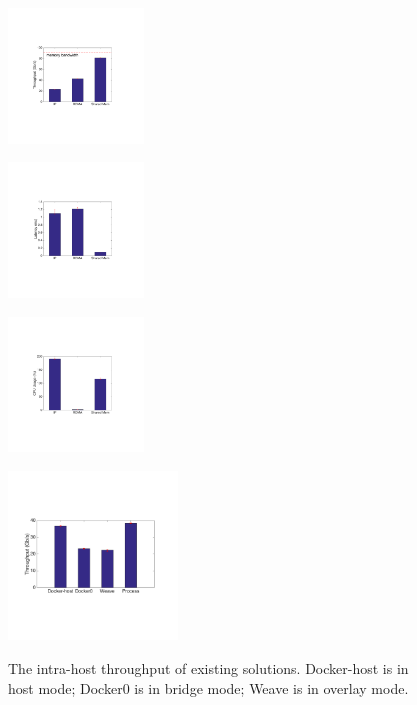 \iffalse

     \begin{figure}[ht]
     \centering 
     \includegraphics[width=0.32\textwidth]{figures/motivation/eval_baremetal_thr.pdf}      
     \label{fig:eval_baremetal_thr}
     \caption{} 
     \end{figure}

     \begin{figure}[ht]
     \centering 
     \includegraphics[width=0.32\textwidth]{figures/motivation/eval_baremetal_latency.pdf}      
     \label{fig:eval_baremetal_latency}
     \caption{} 
     \end{figure}

     \begin{figure}[ht]
     \centering 
     \includegraphics[width=0.32\textwidth]{figures/motivation/eval_baremetal_cpu.pdf}      
     \label{fig:eval_baremetal_cpu}
     \caption{} 
     \end{figure}

\begin{figure}[ht]
     \centering 
     \includegraphics[width=0.4\textwidth]{figures/motivation/eval_exist_bw.pdf} 
     \label{fig:eval_exist_bw}
     \caption{The intra-host throughput of existing solutions. Docker-host is in host mode; Docker0 is in bridge mode; Weave is in overlay mode.} 
\end{figure} 

